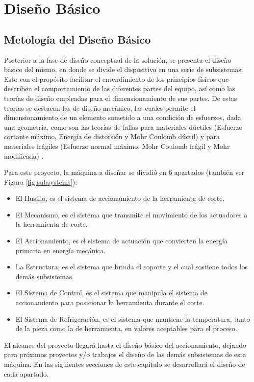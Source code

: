 \chapter{Diseño Básico}

\section{Metología del Diseño Básico}
Posterior a la fase de diseño conceptual de la solución, se presenta el diseño básico del mismo, en donde se divide el dispositivo en una serie de subsistemas. Esto con el propósito facilitar el entendimiento de los principios físicos que describen el comportamiento de las diferentes partes del equipo, así como las teorías de diseño empleadas para el dimensionamiento de sus partes. De estas teorías se destacan las de diseño mecánico, las cuales permite el dimensionamiento de un elemento sometido a una condición de esfuerzos, dada una geometría, como son las teorías de fallas para materiales dúctiles (Esfuerzo cortante máximo, Energía de distorsión y Mohr Coulomb dúctil) y para materiales frágiles (Esfuerzo normal máximo, Mohr Coulomb frágil y Mohr modificada) \citep{shigley2011shigley}.

Para este proyecto, la máquina a diseñar se dividió en 6 apartados (también ver Figura \ref{fig:subsystems}):

\begin{itemize} \nosep
    \item El Husillo, es el sistema de accionamiento de la herramienta de corte.
    \item El Mecanismo, es el sistema que transmite el movimiento de los actuadores a la herramienta de corte.
    \item El Accionamiento, es el sistema de actuación que convierten la energía primaria en energía mecánica.
    \item La Estructura, es el sistema que brinda el soporte y el cual sostiene todos los demás subsistemas.
    \item El Sistema de Control, es el sistema que manipula el sistema de accionamiento para posicionar la herramienta durante el corte.
    \item El Sistema de Refrigeración, es el sistema que mantiene la temperatura, tanto de la pieza como la de herramienta, en valores aceptables para el proceso.
\end{itemize}

El alcance del proyecto llegará hasta el diseño básico del accionamiento, dejando para próximos proyectos y/o trabajos el diseño de las demás subsistemas de esta máquina. En las siguientes secciones de este capítulo se desarrollará el diseño de cada apartado.


